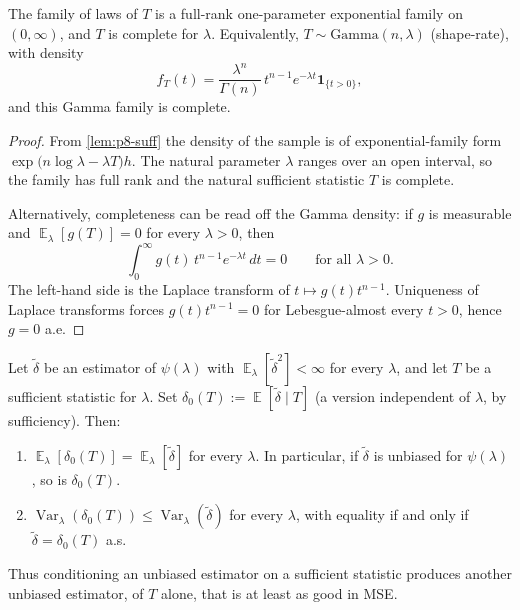\documentclass[11pt,a4paper]{article}
\DeclareMathOperator{\Var}{Var}
\DeclareMathOperator{\E}{\mathbb{E}}
\begin{document}
\begin{lemma}
\label{lem:p8-complete}
The family of laws of \(T\) is a full-rank one-parameter exponential family on \((0,\infty)\), and \(T\) is complete for \(\lambda\). Equivalently, \(T\sim\mathrm{Gamma}(n,\lambda)\) (shape-rate), with density
\[
f_T(t)
=
\frac{\lambda^n}{\Gamma(n)}\,t^{n-1}e^{-\lambda t}\mathbf{1}_{\{t>0\}},
\]
and this Gamma family is complete.
\end{lemma}

\begin{proof}
From \cref{lem:p8-suff} the density of the sample is of exponential-family form \(\exp\bigl(n\log\lambda-\lambda T\bigr)h\). The natural parameter \(\lambda\) ranges over an open interval, so the family has full rank and the natural sufficient statistic \(T\) is complete.

Alternatively, completeness can be read off the Gamma density: if \(g\) is measurable and \(\E_\lambda[g(T)]=0\) for every \(\lambda>0\), then
\[
\int_0^\infty g(t)\,t^{n-1}e^{-\lambda t}\,dt
=
0
\qquad\text{for all }\lambda>0.
\]
The left-hand side is the Laplace transform of \(t\mapsto g(t)t^{n-1}\). Uniqueness of Laplace transforms forces \(g(t)t^{n-1}=0\) for Lebesgue-almost every \(t>0\), hence \(g=0\) a.e.
\end{proof}

\begin{lemma}
\label{lem:p8-rb}
Let \(\tilde\delta\) be an estimator of \(\psi(\lambda)\) with \(\E_\lambda[\tilde\delta^2]<\infty\) for every \(\lambda\), and let \(T\) be a sufficient statistic for \(\lambda\). Set \(\delta_0(T):=\E[\tilde\delta\mid T]\) (a version independent of \(\lambda\), by sufficiency). Then:
\begin{enumerate}[label=(\roman*)]
    \item
    \(\E_\lambda[\delta_0(T)]=\E_\lambda[\tilde\delta]\) for every \(\lambda\). In particular, if \(\tilde\delta\) is unbiased for \(\psi(\lambda)\), so is \(\delta_0(T)\).
    \item
    \(\Var_\lambda(\delta_0(T))\le\Var_\lambda(\tilde\delta)\) for every \(\lambda\), with equality if and only if \(\tilde\delta=\delta_0(T)\) a.s.
\end{enumerate}
Thus conditioning an unbiased estimator on a sufficient statistic produces another unbiased estimator, of \(T\) alone, that is at least as good in MSE.
\end{lemma}
\end{document}
